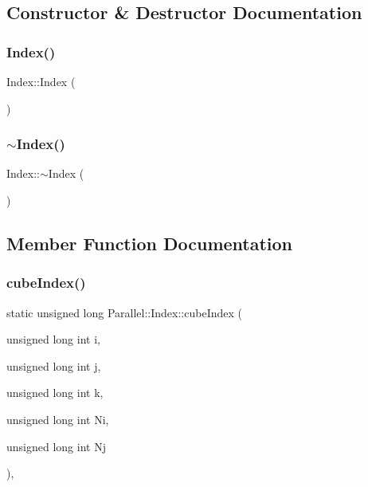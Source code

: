 \subsection{Constructor \& Destructor Documentation}
\mbox{\label{class_parallel_1_1_index_ae767eedba252c26cc0dc5e60f0b9ed9b}} 
\subsubsection{\texorpdfstring{Index()}{Index()}}
{\footnotesize\ttfamily Index\+::\+Index (\begin{DoxyParamCaption}{ }\end{DoxyParamCaption})}

\mbox{\label{class_parallel_1_1_index_a76b7ed4e9cb0b1540264567f84896032}} 
\subsubsection{\texorpdfstring{$\sim$Index()}{~Index()}}
{\footnotesize\ttfamily Index\+::$\sim$\+Index (\begin{DoxyParamCaption}{ }\end{DoxyParamCaption})}



\subsection{Member Function Documentation}
\mbox{\label{class_parallel_1_1_index_ac406d7ceb12e986a66d64ef98fcef5d3}} 
\subsubsection{\texorpdfstring{cubeIndex()}{cubeIndex()}}
{\footnotesize\ttfamily static unsigned long Parallel\+::\+Index\+::cube\+Index (\begin{DoxyParamCaption}\item[{unsigned long int}]{i,  }\item[{unsigned long int}]{j,  }\item[{unsigned long int}]{k,  }\item[{unsigned long int}]{Ni,  }\item[{unsigned long int}]{Nj }\end{DoxyParamCaption})\hspace{0.3cm}{\ttfamily [inline]}, {\ttfamily [static]}}

